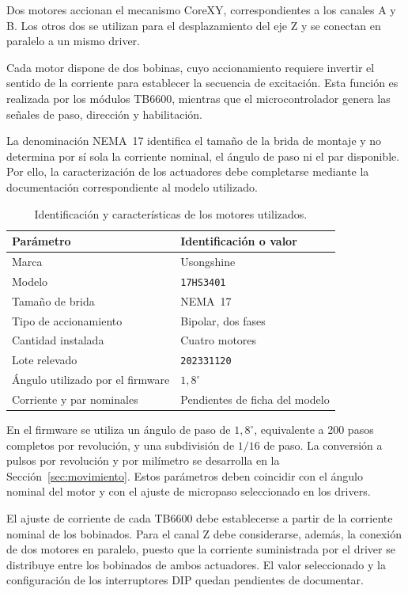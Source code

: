 \documentclass[blue,fullpaper]{ludusofficial}  %
\begin{document}
Dos motores accionan el mecanismo CoreXY,
correspondientes a los canales A y B. Los otros
dos se utilizan para el desplazamiento del eje Z
y se conectan en paralelo a un mismo driver.

Cada motor dispone de dos bobinas, cuyo accionamiento
requiere invertir el sentido de la corriente
para establecer la secuencia de excitación.
Esta función es realizada por los módulos TB6600,
mientras que el microcontrolador genera las señales
de paso, dirección y habilitación.

La denominación NEMA~17 identifica el tamaño
de la brida de montaje y no determina por sí sola
la corriente nominal, el ángulo de paso ni el par
disponible. Por ello, la caracterización de los
actuadores debe completarse mediante la documentación
correspondiente al modelo utilizado.

\begin{table}[htbp]
    \centering
    \small
    \caption{Identificación y características
    de los motores utilizados.}
    \label{tab:motores-seleccionados}
    \begin{tabular}{ll}
        \hline
        Parámetro & Identificación o valor \\
        \hline
        Marca & Usongshine \\
        Modelo & \texttt{17HS3401} \\
        Tamaño de brida & NEMA~17 \\
        Tipo de accionamiento & Bipolar, dos fases \\
        Cantidad instalada & Cuatro motores \\
        Lote relevado & \texttt{202331120} \\
        Ángulo utilizado por el firmware & $1{,}8^\circ$\\
        Corriente y par nominales & Pendientes de ficha del modelo \\
        \hline
    \end{tabular}
\end{table}

En el firmware se utiliza un ángulo de paso
de $1{,}8^\circ$, equivalente a 200 pasos completos
por revolución, y una subdivisión de $1/16$ de paso.
La conversión a pulsos por revolución y por milímetro se desarrolla en la Sección~\ref{sec:movimiento}. Estos parámetros deben coincidir
con el ángulo nominal del motor y con el ajuste
de micropaso seleccionado en los drivers.

El ajuste de corriente de cada TB6600 debe
establecerse a partir de la corriente nominal
de los bobinados. Para el canal Z debe considerarse,
además, la conexión de dos motores en paralelo,
puesto que la corriente suministrada por el driver
se distribuye entre los bobinados de ambos actuadores.
El valor seleccionado y la configuración de los
interruptores DIP quedan pendientes de documentar.
\end{document}
